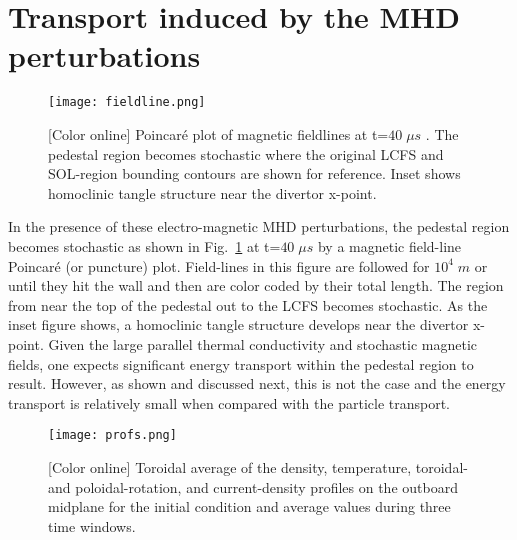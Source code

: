 \section{Transport induced by the MHD perturbations}
\label{sec:transport}

\begin{figure}
  \centering
  \texttt{[image: fieldline.png]}
  \vspace{-4mm}
  \caption{[Color online]
  Poincaré plot of magnetic fieldlines at t=$40\;\mu s$ . The pedestal region
  becomes stochastic where the original LCFS and SOL-region bounding contours are
  shown for reference. Inset shows homoclinic tangle structure near the divertor
  x-point.  }
  \label{fig:fieldline}
\end{figure}

In the presence of these electro-magnetic MHD perturbations, the pedestal
region becomes stochastic as shown in Fig.~\ref{fig:fieldline} at t=$40\;\mu s$
by a magnetic field-line Poincaré (or puncture) plot. Field-lines in this
figure are followed for $10^4\;m$ or until they hit the wall and then are color
coded by their total length.  The region from near the top of the pedestal out
to the LCFS becomes stochastic. As the inset figure shows, a homoclinic tangle
structure \cite{evans02,roeder03,evans05} develops near the divertor x-point.
Given the large parallel thermal conductivity and stochastic magnetic fields,
one expects significant energy transport within the pedestal region to result.
However, as shown and discussed next, this is not the case and the energy
transport is relatively small when compared with the particle transport.

\begin{figure}
  \centering
  \texttt{[image: profs.png]}
  \vspace{-4mm}
  \caption{[Color online]
  Toroidal average of the density, temperature, toroidal- and
  poloidal-rotation, and current-density profiles on the outboard midplane for
  the initial condition and average values during three time windows. }
  \label{fig:profs}
\end{figure}

